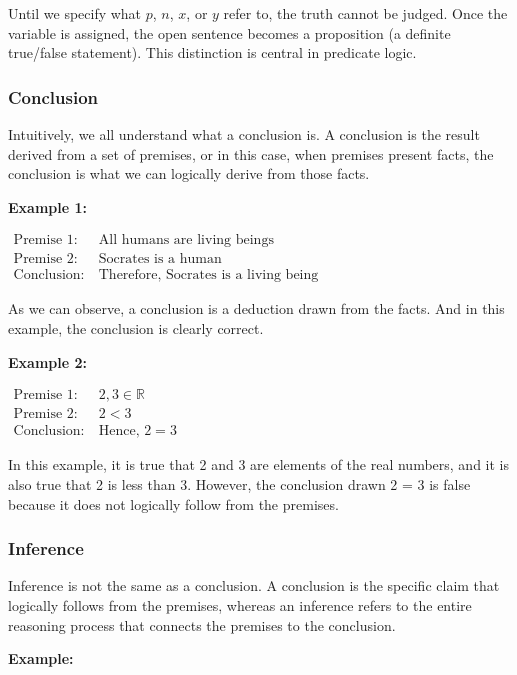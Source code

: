 \documentclass[12pt,a4paper,openany]{article}
\begin{document}
Until we specify what $p$, $n$, $x$, or $y$ refer to, the truth cannot be judged. Once the variable is assigned, the open sentence becomes a proposition (a definite true/false statement). This distinction is central in predicate logic. 

\subsubsection{Conclusion}

Intuitively, we all understand what a conclusion is. A conclusion is the result derived from a set of premises, or in this case, when premises present facts, the conclusion is what we can logically derive from those facts.

\textbf{Example 1:} 

$
\begin{aligned}
\text{Premise 1:} \ & \text{All humans are living beings} \\
\text{Premise 2:} \ & \text{Socrates is a human} \\
\text{Conclusion:} \ & \text{Therefore, Socrates is a living being}
\end{aligned}
$

As we can observe, a conclusion is a deduction drawn from the facts. And in this example, the conclusion is clearly correct.

\textbf{Example 2:}  

$
\begin{aligned}
\text{Premise 1:} \ & 2, 3 \in \mathbb{R} \\
\text{Premise 2:} \ & 2 < 3 \\
\text{Conclusion:} \ & \text{Hence, } 2 = 3
\end{aligned}
$


In this example, it is true that 2 and 3 are elements of the real numbers, and it is also true that 2 is less than 3. However, the conclusion drawn 2 = 3 is false because it does not logically follow from the premises.

\subsubsection{Inference}

Inference is not the same as a conclusion. A conclusion is the specific claim that logically follows from the premises, whereas an inference refers to the entire reasoning process that connects the premises to the conclusion.  

\textbf{Example:}  
\end{document}
